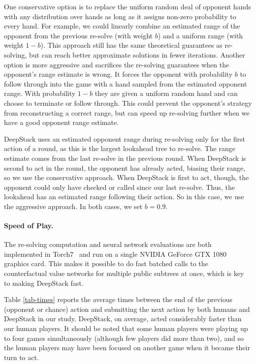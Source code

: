 One conservative option is to replace the uniform random deal of opponent hands with any distribution over hands as long as it assigns non-zero probability to every hand.  For example, we could linearly combine an estimated range of the opponent from the previous re-solve (with weight $b$) and a uniform range (with weight $1-b$).  This approach still has the same theoretical guarantees as re-solving, but can reach better approximate solutions in fewer iterations.  Another option is more aggressive and sacrifices the re-solving guarantees when the opponent's range estimate is wrong.  It forces the opponent with probability $b$ to follow through into the game with a hand sampled from the estimated opponent range.  With probability $1-b$ they are given a uniform random hand and can choose to terminate or follow through.  This could prevent the opponent's strategy from reconstructing a correct range, but can speed up re-solving further when we have a good opponent range estimate.

DeepStack uses an estimated opponent range during re-solving only for the first action of a round, as this is the largest lookahead tree to re-solve.  The range estimate comes from the last re-solve in the previous round.  When DeepStack is second to act in the round, the opponent has already acted, biasing their range, so we use the conservative approach.  When DeepStack is first to act, though, the opponent could only have checked or called since our last re-solve.  Thus, the lookahead has an estimated range following their action.  So in this case, we use the aggressive approach.  In both cases, we set $b=0.9$.
 
\paragraph{Speed of Play.} 
The re-solving computation and neural network evaluations are both implemented in Torch7~\cite{collobert2011torch7} and run on a single NVIDIA GeForce GTX 1080 graphics card. 
This makes it possible to do fast batched calls to the counterfactual value networks for multiple public subtrees at once, which is key to making DeepStack fast.

Table \ref{tab-times} reports the average times between the end of the previous (opponent or chance) action and submitting the next action by both humans and DeepStack in our study.  DeepStack, on average, acted considerably faster than our human players.  It should be noted that some human players were playing up to four games simultaneously (although few players did more than two), and so the human players may have been focused on another game when it became their turn to act.

